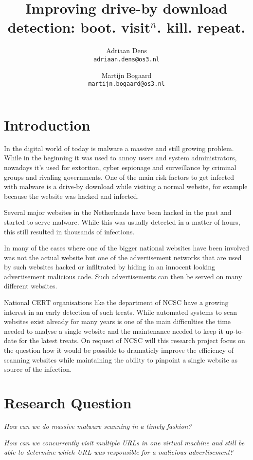 \documentclass{scrartcl}
\title{Improving drive-by download detection: boot. visit$^n$. kill. repeat.}
\author{
  Adriaan Dens\\
   \texttt{adriaan.dens@os3.nl}
  \and
  Martijn Bogaard\\
   \texttt{martijn.bogaard@os3.nl}
}
\begin{document}
\maketitle
\newpage

\section{Introduction}

In the digital world of today is malware a massive and still growing problem. While in the beginning it was used to annoy users and system administrators, nowadays it's used for extortion, cyber espionage and surveillance by criminal groups and rivaling governments. One of the main risk factors to get infected with malware is a drive-by download while visiting a normal website, for example because the website was hacked and infected. 

Several major websites in the Netherlands have been hacked in the past and started to serve malware. While this was usually detected in a matter of hours, this still resulted in thousands of infections.

In many of the cases where one of the bigger national websites have been involved was not the actual website but one of the advertisement networks that are used by such websites hacked or infiltrated by hiding in an innocent looking advertisement malicious code. Such advertisements can then be served on many different websites.

National CERT organisations like the department of NCSC have a growing interest in an early detection of such treats. While automated systems to scan websites exist already for many years is one of the main difficulties the time needed to analyse a single website and the maintenance needed to keep it up-to-date for the latest treats. On request of NCSC will this research project focus on the question how it would be possible to dramaticly improve the efficiency of scanning websites while maintaining the ability to pinpoint a single website as source of the infection.

\section{Research Question}

\textit{How can we do massive malware scanning in a timely fashion?}

\textit{How can we concurrently visit multiple URLs in one virtual machine and still be able to determine which URL was responsible for a malicious advertisement?}
\\
\end{document}
